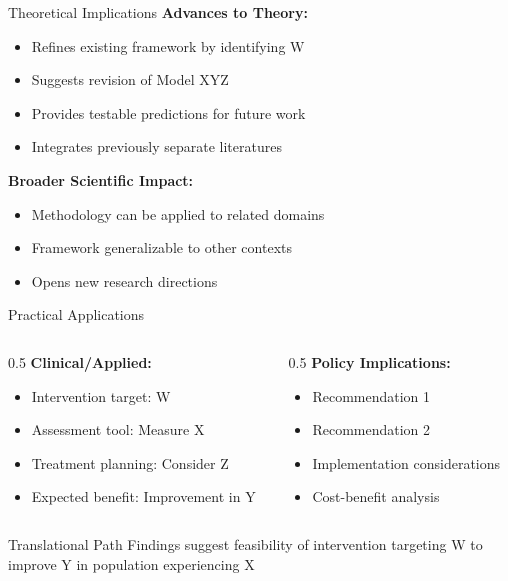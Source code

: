 \documentclass[aspectratio=169,11pt]{beamer}
\begin{document}
\begin{frame}{Theoretical Implications}
  \textbf{Advances to Theory:}
  \begin{itemize}
    \item Refines existing framework by identifying W
    \item Suggests revision of Model XYZ
    \item Provides testable predictions for future work
    \item Integrates previously separate literatures
  \end{itemize}

  \vspace{0.5cm}

  \textbf{Broader Scientific Impact:}
  \begin{itemize}
    \item Methodology can be applied to related domains
    \item Framework generalizable to other contexts
    \item Opens new research directions
  \end{itemize}
\end{frame}

\begin{frame}{Practical Applications}
  \begin{columns}[T]

    \begin{column}{0.5\textwidth}
      \textbf{Clinical/Applied:}
      \begin{itemize}
        \item Intervention target: W
        \item Assessment tool: Measure X
        \item Treatment planning: Consider Z
        \item Expected benefit: Improvement in Y
      \end{itemize}
    \end{column}

    \begin{column}{0.5\textwidth}
      \textbf{Policy Implications:}
      \begin{itemize}
        \item Recommendation 1
        \item Recommendation 2
        \item Implementation considerations
        \item Cost-benefit analysis
      \end{itemize}
    \end{column}

  \end{columns}

  \vspace{0.5cm}

  \begin{exampleblock}{Translational Path}
    Findings suggest feasibility of intervention targeting W to improve Y in population experiencing X
  \end{exampleblock}
\end{frame}
\end{document}
